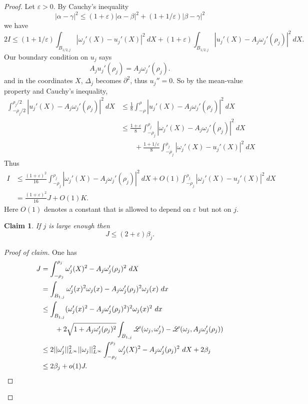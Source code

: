 \documentclass[reqno,12pt,letterpaper]{amsart}
\newtheorem{claim}[theorem]{Claim}
\theoremstyle{definition}
\numberwithin{equation}{section}
\begin{document}
\begin{proof}
Let $\varepsilon > 0$.
By Cauchy's inequality
$$|\alpha - \gamma|^2 \leq (1 + \varepsilon) |\alpha - \beta|^2 + (1 + 1/\varepsilon) |\beta - \gamma|^2$$
we have
$$2I \leq (1 + 1/\varepsilon) \int_{B_{1/2,j}} |\omega_j'(X) - u_j'(X)|^2 ~dX + (1 + \varepsilon) \int_{B_{1/2,j}} |u_j'(X) -  A_j \omega_j'(\rho_j)|^2 ~dX.$$
Our boundary condition on $u_j$ says
$$A_j u_j'(\rho_j) = A_j\omega_j'(\rho_j).$$
and in the coordinates $X$, $\Delta_j$ becomes $\partial^2$, thus $u_j'' = 0$.
So by the mean-value property and Cauchy's inequality,
\begin{align*}
\int_{-\rho_j/2}^{\rho_j/2} |u_j'(X) -  A_j \omega_j'(\rho_j)|^2 ~dX &\leq \frac{1}{8} \int_{-\rho}^{\rho} |u_j'(X) -  A_j \omega_j'(\rho_j)|^2 ~dX\\
&\leq \frac{1 + \varepsilon}{8} \int_{-\rho_j}^{\rho_j} |\omega_j'(X) -  A_j \omega_j'(\rho_j)|^2 ~dX \\
&\qquad + \frac{1 + 1/\varepsilon}{8} \int_{-\rho_j}^{\rho_j} |\omega_j'(X) - u_j'(X)|^2 ~dX
\end{align*}
Thus
\begin{align*}
I &\leq \frac{(1 + \varepsilon)^2}{16} \int_{-\rho_j}^{\rho_j} |\omega_j'(X) -  A_j \omega_j'(\rho_j)|^2 ~dX + O(1) \int_{-\rho_j}^{\rho_j} |\omega_j'(X) - u_j'(X)|^2 ~dX\\
&= \frac{(1 + \varepsilon)^2}{16} J + O(1) K.
\end{align*}
Here $O(1)$ denotes a constant that is allowed to depend on $\varepsilon$ but not on $j$.

\begin{claim}
If $j$ is large enough then
$$J \leq (2 + \varepsilon)\beta_j.$$
\end{claim}
\begin{proof}[Proof of claim]
One has
\begin{align*}
J &= \int_{-\rho_j}^{\rho_j} \omega_j'(X)^2 -  A_j \omega_j'(\rho_j)^2 ~dX \\
&= \int_{B_{1, j}} \omega_j'(x)^2 \omega_j(x) -  A_j \omega_j'(\rho_j)^2 \omega_j(x) ~dx \\
&\leq \int_{B_{1, j}} (\omega_j'(x)^2 -  A_j \omega_j'(\rho_j)^2)^2 \omega_j(x)^2 ~dx \\
&\qquad + 2\sqrt{1 +  A_j \omega_j'(\rho_j)^2} \int_{B_{1,j}} \mathscr L(\omega_j, \omega_j') - \mathscr L(\omega_j,  A_j \omega_j'(\rho_j)) \\
&\leq 2 ||\omega_j' ||_{L^\infty}^2 ||\omega_j||_{L^\infty}^2 \int_{-\rho_j}^{\rho_j} \omega_j'(X)^2 -  A_j \omega_j'(\rho_j)^2 ~dX + 2 \beta_j\\
&\leq 2\beta_j + o(1) J. \qedhere
\end{align*}
\end{proof}


\end{proof}
\end{document}
